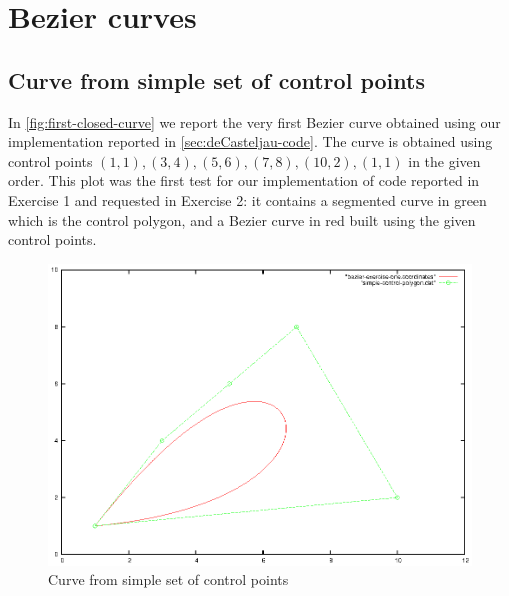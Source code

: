 \documentclass{article}
\begin{document}
\title{\rmfamily\normalfont{}}

\author{}
\date{\today}

\maketitle


\begin{abstract}
  This document contains some exercises and collects work done during
  the CAGD course given by Prof. Alessandra Sestini and Prof. Costanza
  Conti at University of Florence.

  The content is organized in sections, each one of them correspond to
  a given set of exercises, the last one report the raw implementation
  code written in Julia \cite{Julia}.
\end{abstract}

\tableofcontents

\newpage

\section{Bezier curves}

\subsection{Curve from simple set of control points}
In \autoref{fig:first-closed-curve} we report the very first Bezier
curve obtained using our implementation reported in
\autoref{sec:deCasteljau-code}. The curve is obtained using control
points $(1,1), (3,4), (5,6),(7,8),(10,2),(1,1)$ in the given
order. This plot was the first test for our implementation of code
reported in Exercise 1 and requested in Exercise 2: it contains a
segmented curve in green which is the control polygon, and a Bezier
curve in red built using the given control points.
\begin{figure}[h!]
  \centering
  \includegraphics{bezier-deCasteljau-curves/exercise-one}
  \caption{Curve from simple set of control points}
  \label{fig:first-closed-curve}
\end{figure}
\end{document}

